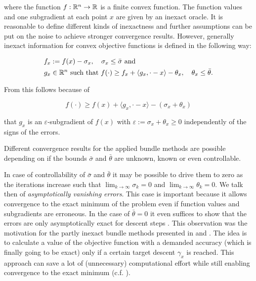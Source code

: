 where the function \(f:\mathbb{R}^n \to \mathbb{R}\) is a finite convex function. The function values and one subgradient at each point \(x\) are given by an inexact oracle.
It is reasonable to define different kinds of inexactness and further assumptions can be put on the noise to achieve stronger convergence results. However, generally inexact information for convex objective functions is defined in the following way:

\begin{align}
	f_x &:= f(x)-\sigma_x, \quad \sigma_x \leq \bar{\sigma} \text{ and}\label{conv_inexactness_1}\\
	g_x &\in \mathbb{R}^n \text{ such that } f(\cdot) \geq f_x + \langle g_x, \cdot - x \rangle - \theta_x, \quad \theta_x \leq \bar{\theta}.
	\label{conv_inexactness_2}
\end{align}

From this follows because of

\begin{equation}
	f(\cdot) \geq f(x)+\langle g_x, \cdot - x \rangle - (\sigma_x+\theta_x)
	\label{sig_p_thet_subgr}
\end{equation}

that \(g_x\) is an \(\varepsilon\)-subgradient of \(f(x)\) with \(\varepsilon := \sigma_x+\theta_x \geq 0\) independently of the signs of the errors.

Different convergence results for the applied bundle methods are possible depending on if the bounds \(\bar{\sigma}\) and \(\bar{\theta}\) are unknown, known or even controllable.

In case of controllability of \(\bar{\sigma}\) and \(\bar{\theta}\) it may be possible to drive them to zero  as the iterations increase such that \(\lim_{k \to \infty} \sigma_k = 0\) and \(\lim_{k \to \infty} \theta_k =  0\). We talk then of \emph{asymptotically vanishing errors}. 
This case is important because it allows convergence to the exact minimum of the problem even if function values and subgradients are erroneous. In the case of \(\bar{\theta} = 0\) it even suffices to show that the errors are only asymptotically exact for descent steps \cite{Kiwiel2010}.
This observation was the motivation for the partly inexact bundle methods presented in \cite{Kiwiel2010} and \cite{Oliveira2014}.
The idea is to calculate a value of the objective function with a demanded accuracy (which is finally going to be exact) only if a certain target descent \(\gamma_x\) is reached. This approach can save a lot of (unnecessary) computational effort while still enabling convergence to the exact minimum (c.f. \cite{Oliveira2014}).

